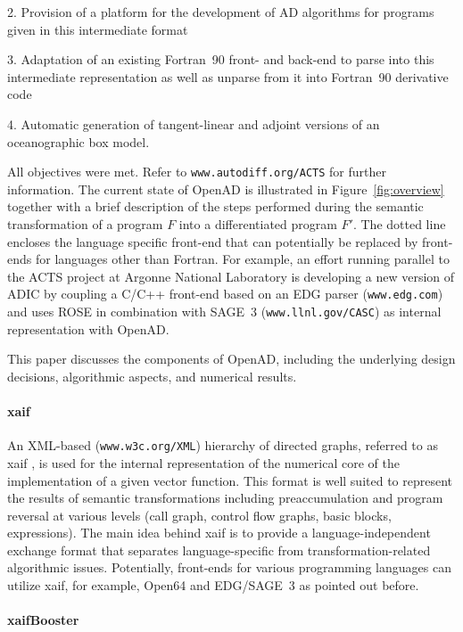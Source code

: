 \documentclass{article}
\newcommand{\fig}[1]{Figure~#1}
\begin{document}
2. Provision of a platform for the development of AD algorithms for 
programs given in this intermediate format

3. Adaptation of an existing Fortran~90 front- and back-end to parse into 
this intermediate representation as well as unparse from it into Fortran~90
derivative code 

4. Automatic generation of tangent-linear and adjoint versions of 
an oceanographic box model.

All objectives were met. Refer to {\tt www.autodiff.org/ACTS} for further 
information.
The current state of OpenAD is illustrated in 
\fig{\ref{fig:overview}} together with a brief description of the steps
performed during the semantic transformation of a program $F$ into
a differentiated program $F'$.
The dotted line encloses the language specific front-end that can potentially
be replaced by front-ends for languages other than Fortran. For example, an 
effort running parallel to the ACTS project at Argonne National Laboratory is 
developing a new version of ADIC \cite{HoNo01} by coupling a C/C++ 
front-end 
based on an EDG parser ({\tt www.edg.com}) and uses ROSE in combination with SAGE~3 ({\tt www.llnl.gov/CASC}) as internal representation
with OpenAD.

This paper discusses the components of OpenAD,
including the underlying design decisions, algorithmic aspects, and
numerical results.

\paragraph{xaif} 
An XML-based ({\tt www.w3c.org/XML}) hierarchy of directed graphs, referred to as xaif 
\cite{HNN02}, is used for the 
internal representation of the numerical core of the implementation
of a given vector function. This format is 
well suited to represent the results of  semantic transformations including 
preaccumulation \cite{BiHa96,CDB96,GrRe91} and 
program reversal \cite{Gri92,WaGr01} at various levels (call graph, control 
flow graphs, basic blocks, expressions). 
The main idea behind xaif is to provide a language-independent exchange
format that separates language-specific from transformation-related 
algorithmic issues. Potentially, front-ends for various programming languages 
can utilize xaif, for example, Open64 and EDG/SAGE~3 as pointed out before.

\paragraph{xaifBooster} 
\end{document}
